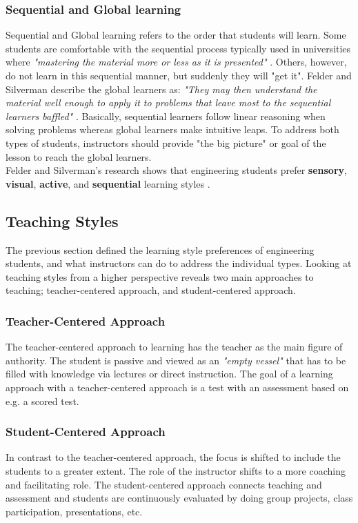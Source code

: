 \subsubsection*{Sequential and Global learning}
Sequential and Global learning refers to the order that students will learn. Some students are comfortable with the sequential process typically used in universities where \textit{"mastering the material more or less as it is presented"} \cite[p. 679]{Felder88k.:learning}. Others, however, do not learn in this sequential manner, but suddenly they will "get it". Felder and Silverman describe the global learners as: \textit{"They may then understand the material well enough to apply it to problems that leave most to the sequential learners baffled"} \cite[p. 679]{Felder88k.:learning}. Basically, sequential learners follow linear reasoning when solving problems whereas global learners make intuitive leaps. To address both types of students, instructors should provide "the big picture" or goal of the lesson to reach the global learners. \\

\noindent
Felder and Silverman's research shows that engineering students prefer \textbf{sensory}, \textbf{visual}, \textbf{active}, and \textbf{sequential} learning styles \cite[p. 680]{Felder88k.:learning}.


\subsection*{Teaching Styles}
The previous section defined the learning style preferences of engineering students, and what instructors can do to address the individual types. Looking at teaching styles from a higher perspective reveals two main approaches to teaching; teacher-centered approach, and student-centered approach.
 
\subsubsection*{Teacher-Centered Approach}
The teacher-centered approach to learning has the teacher as the main figure of authority. The student is passive and viewed as an \textit{"empty vessel"} \cite{teaching_methods} that has to be filled with knowledge via lectures or direct instruction. The goal of a learning approach with a teacher-centered approach is a test with an assessment based on e.g. a scored test. 

\subsubsection*{Student-Centered Approach}
In contrast to the teacher-centered approach, the focus is shifted to include the students to a greater extent. The role of the instructor shifts to a more coaching and facilitating role. The student-centered approach connects teaching and assessment and students are continuously evaluated by doing group projects, class participation, presentations, etc. \\


